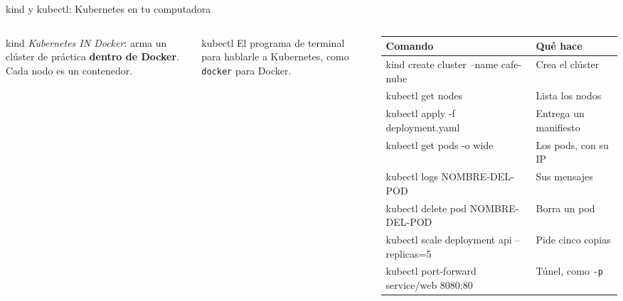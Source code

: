 \documentclass[aspectratio=169,10pt,c]{beamer}
\begin{document}
\begin{frame}{kind y kubectl: Kubernetes en tu computadora}
\begin{columns}[T,onlytextwidth]
\begin{block}{kind}
\small \textit{Kubernetes IN Docker}: arma un clúster de práctica \textbf{dentro de Docker}. Cada nodo es un contenedor.
\end{block}
\begin{block}{kubectl}
\small El programa de terminal para hablarle a Kubernetes, como \texttt{docker} para Docker.
\end{block}
\begin{center}
\end{center}
\renewcommand{\arraystretch}{1.15}
\begin{tabular}{@{}>{\ttfamily\scriptsize}l>{\raggedright\arraybackslash\scriptsize}p{2.3cm}@{}}
\toprule
\textsf{\textbf{\small Comando}} & \textbf{\small Qué hace}\\
\midrule
kind create cluster --name cafe-nube & Crea el clúster\\
kubectl get nodes & Lista los nodos\\
kubectl apply -f deployment.yaml & Entrega un manifiesto\\
kubectl get pods -o wide & Los pods, con su IP\\
kubectl logs NOMBRE-DEL-POD & Sus mensajes\\
kubectl delete pod NOMBRE-DEL-POD & Borra un pod\\
kubectl scale deployment api --replicas=5 & Pide cinco copias\\
kubectl port-forward service/web 8080:80 & Túnel, como \texttt{-p}\\
\bottomrule
\end{tabular}
\end{columns}
\end{frame}
\end{document}
